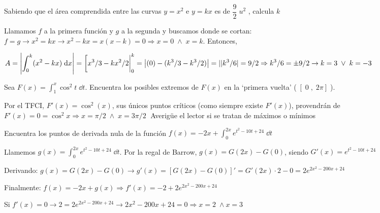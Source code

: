 \begin{ejre}
Sabiendo que el área comprendida entre las curvas $y=x^2$ e $y=kx$ es de $\dfrac 9 2 \; u^2$	, calcula $k$
\end{ejre}

\begin{proofw}\renewcommand{\qedsymbol}{$\diamond$}	

Llamamos $f$ a la primera función y $g$ a la segunda	 y buscamos donde se cortan: $f=g \to x^2=kx \to x^2-kx=x(x-k)=0 \Rightarrow x=0 \; \wedge \; x=k$. Entonces,

$A=\displaystyle \left| \int_0^k (x^2-kx)\; \dd x \right|= \eval[x^3/3 -kx^2/2|_0^k= \left|(0)-(k^3/3-k^3/2) \right| = | |k^3/6|=9/2 \Rightarrow k^3/6=\pm 9/2 \to k=3 \; \vee \; k=-3 $
\end{proofw}


\begin{ejre}
	Sea $F(x)=\displaystyle \int_1^x \cos^2 t \; \dd t$. Encuentra los posibles extremos de $F(x)$ en la `primera vuelta' ($\; [\; 0\; ,\; 2\pi]\; $).
\end{ejre}

\begin{proofw}\renewcommand{\qedsymbol}{$\diamond$}	

Por el TFCI, $F'(x)=\cos^2(x)$, sus únicos puntos críticos (como siempre existe $F'(x)$), provendrán de $F'(x)=0=\cos^2 x \Rightarrow x=\pi/2 \; \wedge \; x= 3\pi/2\; $ \textcolor{gris}{Averigüe el lector si se tratan de máximos o mínimos}

\end{proofw}

\begin{ejre}

Encuentra los puntos de derivada nula de la función $f(x)=-2x+\displaystyle \int_0^{2x} e^{t^2-10t+24}\; \dd t$	
\end{ejre}
\begin{proofw}\renewcommand{\qedsymbol}{$\diamond$}	
	
	Llamemos $g(x)=\displaystyle \int_0^{2x} e^{t^2-10t+24}\; \dd t$. Por la regal de Barrow, $g(x)=G(2x)-G(0)$, siendo $G'(x)=e^{t^2-10t+24}$
	
	Derivando: $g(x)=G(2x)-G(0) \to g'(x)= \left[ G(2x)-G(0) \right]'=G'(2x)\cdot 2 -0 =2 e^{2x^2-200x+24}$
	
	Finalmente: $f(x)=-2x+g(x) \Rightarrow f'(x)= -2+2 e^{2x^2-200x+24}$
	
	Si $f'(x)=0\to 2=2 e^{2x^2-200x+24} \to 2x^2-200x+24=0 \Rightarrow x=2 \; \wedge x=3$
\end{proofw}



